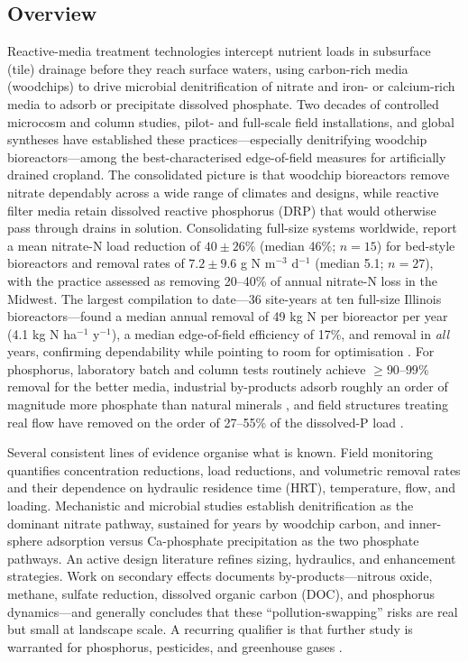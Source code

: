 \subsection{Overview}

Reactive-media treatment technologies intercept nutrient loads in subsurface (tile) drainage before they reach surface waters, using carbon-rich media (woodchips) to drive microbial denitrification of nitrate and iron- or calcium-rich media to adsorb or precipitate dissolved phosphate. Two decades of controlled microcosm and column studies, pilot- and full-scale field installations, and global syntheses have established these practices---especially denitrifying woodchip bioreactors---among the best-characterised edge-of-field measures for artificially drained cropland. The consolidated picture is that woodchip bioreactors remove nitrate dependably across a wide range of climates and designs, while reactive filter media retain dissolved reactive phosphorus (DRP) that would otherwise pass through drains in solution. Consolidating full-size systems worldwide, \textcite{Christianson2021} report a mean nitrate-N load reduction of $40 \pm 26\%$ (median 46\%; $n=15$) for bed-style bioreactors and removal rates of $7.2 \pm 9.6$ g N m$^{-3}$ d$^{-1}$ (median 5.1; $n=27$), with the practice assessed as removing 20--40\% of annual nitrate-N loss in the Midwest. The largest compilation to date---36 site-years at ten full-size Illinois bioreactors---found a median annual removal of 49 kg N per bioreactor per year (4.1 kg N ha$^{-1}$ y$^{-1}$), a median edge-of-field efficiency of 17\%, and removal in \emph{all} years, confirming dependability while pointing to room for optimisation \parencite{Christianson2026}. For phosphorus, laboratory batch and column tests routinely achieve $\geq 90$--$99\%$ removal for the better media, industrial by-products adsorb roughly an order of magnitude more phosphate than natural minerals \parencite{Sellner2019b}, and field structures treating real flow have removed on the order of 27--55\% of the dissolved-P load \parencite{Penn2020,Penn2024,Shedekar2020}.

Several consistent lines of evidence organise what is known. Field monitoring quantifies concentration reductions, load reductions, and volumetric removal rates and their dependence on hydraulic residence time (HRT), temperature, flow, and loading. Mechanistic and microbial studies establish denitrification as the dominant nitrate pathway, sustained for years by woodchip carbon, and inner-sphere adsorption versus Ca-phosphate precipitation as the two phosphate pathways. An active design literature refines sizing, hydraulics, and enhancement strategies. Work on secondary effects documents by-products---nitrous oxide, methane, sulfate reduction, dissolved organic carbon (DOC), and phosphorus dynamics---and generally concludes that these ``pollution-swapping'' risks are real but small at landscape scale. A recurring qualifier is that further study is warranted for phosphorus, pesticides, and greenhouse gases \parencite{Mitchell2023}.


